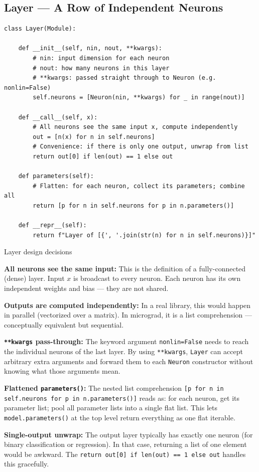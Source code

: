 \documentclass[12pt,a4paper]{article}
\newcommand{\code}[1]{\texttt{\small\color{deepblue}#1}}
\begin{document}
\subsection{Layer — A Row of Independent Neurons}

\begin{lstlisting}
class Layer(Module):

    def __init__(self, nin, nout, **kwargs):
        # nin: input dimension for each neuron
        # nout: how many neurons in this layer
        # **kwargs: passed straight through to Neuron (e.g. nonlin=False)
        self.neurons = [Neuron(nin, **kwargs) for _ in range(nout)]

    def __call__(self, x):
        # All neurons see the same input x, compute independently
        out = [n(x) for n in self.neurons]
        # Convenience: if there is only one output, unwrap from list
        return out[0] if len(out) == 1 else out

    def parameters(self):
        # Flatten: for each neuron, collect its parameters; combine all
        return [p for n in self.neurons for p in n.parameters()]

    def __repr__(self):
        return f"Layer of [{', '.join(str(n) for n in self.neurons)}]"
\end{lstlisting}

\begin{codeexplainbox}{Layer design decisions}

\textbf{All neurons see the same input:} This is the definition of a fully-connected (dense) layer. Input $x$ is broadcast to every neuron. Each neuron has its own independent weights and bias — they are not shared.

\textbf{Outputs are computed independently:} In a real library, this would happen in parallel (vectorized over a matrix). In micrograd, it is a list comprehension — conceptually equivalent but sequential.

\textbf{\code{**kwargs} pass-through:} The keyword argument \code{nonlin=False} needs to reach the individual neurons of the last layer. By using \code{**kwargs}, \code{Layer} can accept arbitrary extra arguments and forward them to each \code{Neuron} constructor without knowing what those arguments mean.

\textbf{Flattened \code{parameters()}:} The nested list comprehension \code{[p for n in self.neurons for p in n.parameters()]} reads as: for each neuron, get its parameter list; pool all parameter lists into a single flat list. This lets \code{model.parameters()} at the top level return everything as one flat iterable.

\textbf{Single-output unwrap:} The output layer typically has exactly one neuron (for binary classification or regression). In that case, returning a list of one element would be awkward. The \code{return out[0] if len(out) == 1 else out} handles this gracefully.
\end{codeexplainbox}
\end{document}
